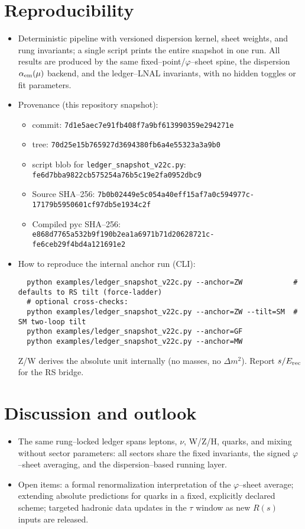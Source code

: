 \documentclass[%
 amsmath,amssymb,
 aps,
prb,
floatfix, showkeys
]{revtex4-2}
\begin{document}
\onecolumngrid


\section{Reproducibility}
\begin{itemize}
  \item Deterministic pipeline with versioned dispersion kernel, sheet weights, and rung invariants; a single script prints the entire snapshot in one run. All results are produced by the same fixed–point/$\varphi$–sheet spine, the dispersion $\alpha_{\rm em}(\mu)$ backend, and the ledger–LNAL invariants, with no hidden toggles or fit parameters.
  \item Provenance (this repository snapshot): 
    \begin{itemize}
      \item commit: \texttt{7d1e5aec7e91fb408f7a9bf613990359e294271e}
      \item tree: \texttt{70d25e15b765927d3694380fb6a4e55323a3a9b0}
      \item script blob for \texttt{ledger\_snapshot\_v22c.py}: \texttt{fe6d7bba9822cb575254a76b5c19e2fa0952dbc9}
      \item Source SHA--256: \texttt{7b0b02449e5c054a40eff15af7a0c594977c-}\\\texttt{17179b5950601cf97db5e1934c2f}
      \item Compiled pyc SHA--256: \texttt{e868d7765a532b9f190b2ea1a6971b71d20628721c-}\\\texttt{fe6ceb29f4bd4a121691e2}
    \end{itemize}
  \item How to reproduce the internal anchor run (CLI):
  \begin{verbatim}
  python examples/ledger_snapshot_v22c.py --anchor=ZW            # defaults to RS tilt (force-ladder)
  # optional cross-checks:
  python examples/ledger_snapshot_v22c.py --anchor=ZW --tilt=SM  # SM two-loop tilt
  python examples/ledger_snapshot_v22c.py --anchor=GF
  python examples/ledger_snapshot_v22c.py --anchor=MW
  \end{verbatim}
  Z/W derives the absolute unit internally (no masses, no $\Delta m^2$). Report $s/E_{\rm rec}$ for the RS bridge.
\end{itemize}

\section{Discussion and outlook}
\begin{itemize}
  \item The same rung–locked ledger spans leptons, $\nu$, W/Z/H, quarks, and mixing without sector parameters: all sectors share the fixed invariants, the signed $\varphi$–sheet averaging, and the dispersion–based running layer.
  \item Open items: a formal renormalization interpretation of the $\varphi$–sheet average; extending absolute predictions for quarks in a fixed, explicitly declared scheme; targeted hadronic data updates in the $\tau$ window as new $R(s)$ inputs are released.
\end{itemize}
\end{document}

